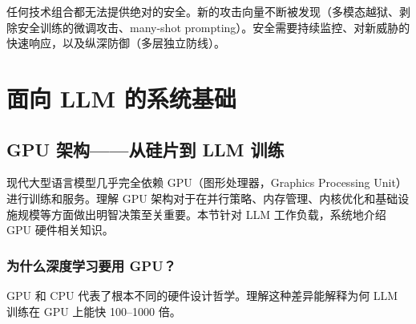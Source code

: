 \begin{warningbox}[安全永无完结]
任何技术组合都无法提供绝对的安全。新的攻击向量不断被发现（多模态越狱、剥除安全训练的微调攻击、many-shot prompting）。安全需要持续监控、对新威胁的快速响应，以及纵深防御（多层独立防线）。
\end{warningbox}

\chapter{面向 LLM 的系统基础}
\label{systems-foundations-for-llms}

\section{GPU 架构——从硅片到 LLM 训练}
\label{gpu-architecture-from-silicon-to-llm-training}

现代大型语言模型几乎完全依赖 GPU（图形处理器，Graphics Processing Unit）进行训练和服务。理解 GPU 架构对于在并行策略、内存管理、内核优化和基础设施规模等方面做出明智决策至关重要。本节针对 LLM 工作负载，系统地介绍 GPU 硬件相关知识。

\subsection{为什么深度学习要用 GPU？}
\label{why-gpus-for-deep-learning}

GPU 和 CPU 代表了根本不同的硬件设计哲学。理解这种差异能解释为何 LLM 训练在 GPU 上能快 100--1000 倍。

